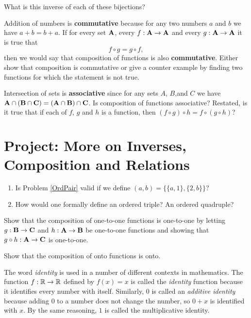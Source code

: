 \begin{prb}
What is this inverse of each of these bijections?
\end{prb}

\begin{prb}
Addition of numbers is \textbf{commutative} because for any two numbers $a$ and $b$ we have $a+b = b+a$. If for every set $\mathbf A$, every $f:\mathbf A \to \mathbf A$ and every $g:\mathbf A \to \mathbf A$ it is true that $$ f \circ g = g \circ f, $$  then we would say that composition of functions is also \textbf{commutative}. Either show that composition is commutative or give a counter example by finding two functions for which the statement is not true.
\end{prb}

\begin{prb}
Intersection of sets is \textbf{associative} since for any sets $A$, $B$,and $C$ we have $\mathbf A \cap (\mathbf B \cap \mathbf C) = (\mathbf A \cap \mathbf B) \cap \mathbf C$. Is composition of functions associative?  Restated, is it true that if each of $f$, $g$ and $h$ is a function, then $(f \circ g) \circ h = f \circ (g \circ h)$?
\end{prb}


\section{Project: More on Inverses, Composition and Relations}

\begin{prb}
\begin{enumerate}
\item Is Problem \ref{OrdPair} valid if we define $(a, b) = \{\{a, 1\}, \{2, b\}\}$?
\item How would one formally define an ordered triple? An ordered quadruple?
\end{enumerate}
\end{prb}

\begin{prb}
\label{inj_fn}
Show that the composition of one-to-one functions is one-to-one by letting $g:\mathbf B \to \mathbf C$ and $h:\mathbf A \to \mathbf B$
be one-to-one functions and showing that $g\circ h:\mathbf A \to \mathbf C$ is one-to-one.
\end{prb}

\begin{prb}
\label{surj_fn}
Show that the composition of onto functions is onto.
\end{prb}

The word \emph{identity} is used in a number of different contexts in mathematics.  The function $f: \mathbb R \to \mathbb R$ defined by $f(x) = x$ is called the \emph{identity} function because it identifies every number with itself.  Similarly, $0$ is called an \emph{additive identity} because adding $0$ to a number does not change the number, so $0+x$ is identified with $x$.  By the same reasoning, $1$ is called the multiplicative identity.

